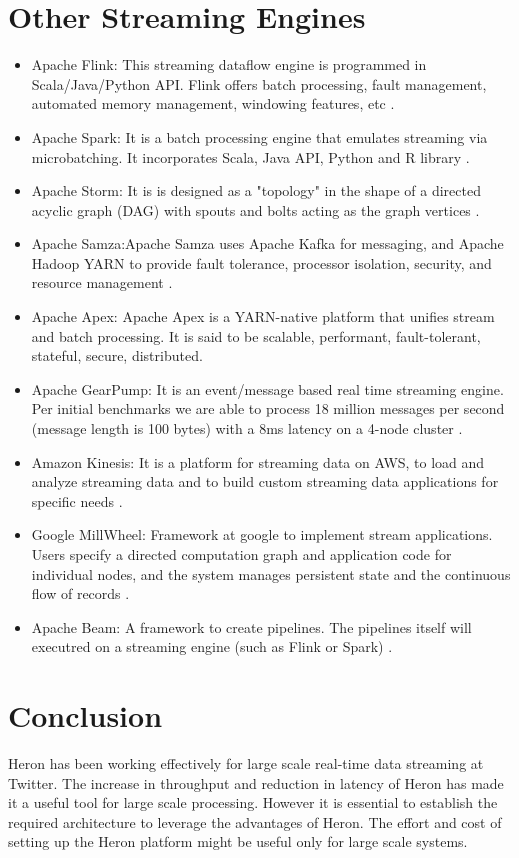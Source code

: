 \documentclass[9pt,twocolumn,twoside]{../../styles/osajnl}
\begin{document}
\section{Other Streaming Engines}
\begin{itemize}
    \item Apache Flink: This streaming dataflow engine is programmed in Scala/Java/Python API. Flink offers batch processing, fault management, automated memory management, windowing features, etc \cite{www-StreamingTechs}.
    \item Apache Spark: It is a batch processing engine that emulates streaming via microbatching. It incorporates Scala, Java API, Python and R library \cite{www-StreamingTechs}.
    \item Apache Storm: It is is designed as a "topology" in the shape of a directed acyclic graph (DAG) with spouts and bolts acting as the graph vertices \cite{TwitterHeron6}.
    \item Apache Samza:Apache Samza uses Apache Kafka for messaging, and Apache Hadoop YARN to provide fault tolerance, processor isolation, security, and resource management \cite{www-ApacheSamza}.
    \item Apache Apex: Apache Apex is a YARN-native platform that unifies stream and batch processing. It is said to be scalable, performant, fault-tolerant, stateful, secure, distributed.
    \item Apache GearPump: It is an event/message based real time streaming engine. Per initial benchmarks we are able to process 18 million messages per second (message length is 100 bytes) with a 8ms latency on a 4-node cluster \cite{www-Gearpump}.
    \item Amazon Kinesis: It is a platform for streaming data on AWS, to load and analyze streaming data and to build custom streaming data applications for specific needs \cite{www-Kinesis}.
    \item Google MillWheel: Framework at google to implement stream applications. Users specify a directed computation graph and application code for individual nodes, and the system manages persistent state and the continuous flow of records \cite{GoogleMillwheel}.
    \item Apache Beam: A framework to create pipelines. The pipelines itself will executred on a streaming engine (such as Flink or Spark) \cite{www-StreamingTechs}.
\end{itemize}
\section{Conclusion}
Heron has been working effectively for large scale real-time data streaming at Twitter. The increase in throughput and reduction in latency of Heron has made it a useful tool for large scale processing. However it is essential to establish the required architecture to leverage the advantages of Heron. The effort and cost of setting up the Heron platform might be useful only for large scale systems. 


\end{document}
